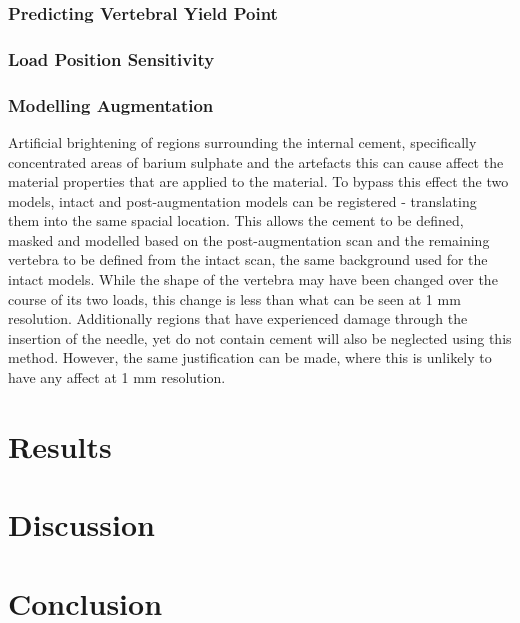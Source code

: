 \subsubsection{Predicting Vertebral Yield Point}\label{predYield}

\subsubsection{Load Position Sensitivity}

\subsubsection{Modelling Augmentation}

Artificial brightening of regions surrounding
the internal cement, specifically concentrated areas of barium sulphate and the
artefacts this can cause affect the material properties that are applied to the
material.
To bypass this effect the two models, intact and post-augmentation models can be
registered - translating them into the same spacial location.
This allows the cement to be defined, masked and modelled based on the
post-augmentation scan and the remaining vertebra to be defined from the intact
scan, the same background used for the intact models.
While the shape of the vertebra may have been changed over the course of its
two loads, this change is less than what can be seen at 1 mm resolution.
Additionally regions that have experienced damage through the insertion of the
needle, yet do not contain cement will also be neglected using this method.
However, the same justification can be made, where this is unlikely to have any
affect at 1 mm resolution.


\section{Results}

\section{Discussion}

\section{Conclusion}







